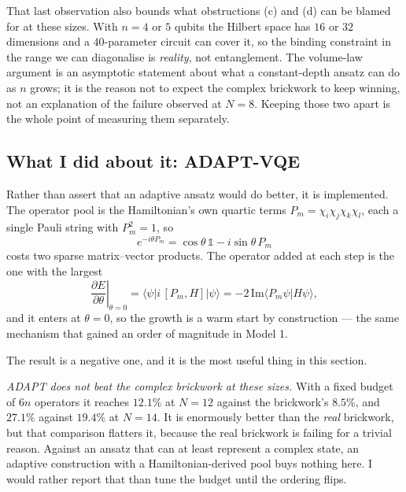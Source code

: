 \documentclass[10pt,a4paper]{article}
\newcommand{\ket}[1]{\lvert #1 \rangle}
\newcommand{\bra}[1]{\langle #1 \rvert}
\newcommand{\ip}[2]{\langle #1 | #2 \rangle}
\begin{document}
That last observation also bounds what obstructions (c) and (d) can be blamed
for at these sizes. With $n=4$ or $5$ qubits the Hilbert space has $16$ or $32$
dimensions and a $40$-parameter circuit can cover it, so the binding constraint
in the range we can diagonalise is \emph{reality}, not entanglement. The
volume-law argument is an asymptotic statement about what a constant-depth
ansatz can do as $n$ grows; it is the reason not to expect the complex
brickwork to keep winning, not an explanation of the failure observed at
$N=8$. Keeping those two apart is the whole point of measuring them
separately.

\subsection{What I did about it: ADAPT-VQE}
\label{sec:adapt}

Rather than assert that an adaptive ansatz would do better, it is implemented.
The operator pool is the Hamiltonian's own quartic terms
$P_m = \chi_i\chi_j\chi_k\chi_l$, each a single Pauli string with $P_m^2=1$, so
\begin{equation}
  e^{-i\theta P_m} = \cos\theta\,\mathbb{1} - i\sin\theta\,P_m
\end{equation}
costs two sparse matrix--vector products. The operator added at each step is
the one with the largest
\begin{equation}
  \left.\frac{\partial E}{\partial \theta}\right|_{\theta=0}
  = \bra{\psi} i\,[P_m, H] \ket{\psi}
  = -2\,\mathrm{Im}\ip{P_m\psi}{H\psi},
\end{equation}
and it enters at $\theta=0$, so the growth is a warm start by construction ---
the same mechanism that gained an order of magnitude in Model 1.

\begin{center}\small

\end{center}

The result is a negative one, and it is the most useful thing in this section.

\emph{ADAPT does not beat the complex brickwork at these sizes.} With a fixed
budget of $6n$ operators it reaches $12.1\%$ at $N=12$ against the brickwork's
$8.5\%$, and $27.1\%$ against $19.4\%$ at $N=14$. It is enormously better than
the \emph{real} brickwork, but that comparison flatters it, because the real
brickwork is failing for a trivial reason. Against an ansatz that can at least
represent a complex state, an adaptive construction with a Hamiltonian-derived
pool buys nothing here. I would rather report that than tune the budget until
the ordering flips.
\end{document}
